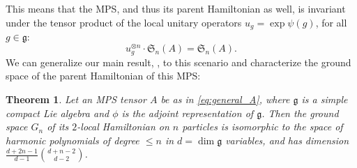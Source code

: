 \documentclass[a4paper]{article}
\newtheorem{theorem}{Theorem}
\theoremstyle{definition}
\begin{document}
This means that the MPS, and thus its parent Hamiltonian as well, is invariant under the tensor product of the local unitary operators $u_g = \exp \psi(g)$, for all $g\in \mathfrak{g}$:
\begin{equation*}
    u_g^{\otimes n} \cdot \mathfrak{S}_n (A) = \mathfrak{S}_n (A).
\end{equation*}
We can generalize our main result, , to this scenario and characterize the ground space of the parent Hamiltonian of this MPS:  
\begin{theorem}
Let an MPS tensor $A$ be as in \cref{eq:general_A}, where $\mathfrak{g}$ is a simple compact Lie algebra  
and $\phi$ is the adjoint representation of $\mathfrak{g}$. Then the ground space $G_n$ of its $2$-local Hamiltonian on $n$ particles 
is isomorphic to the space of harmonic polynomials of degree $\le n$ in $d=\dim \mathfrak{g}$ variables,
and has dimension $\frac{d+2n-1}{d-1} \binom{d+n-2}{d-2}$.
\end{theorem}
\end{document}
